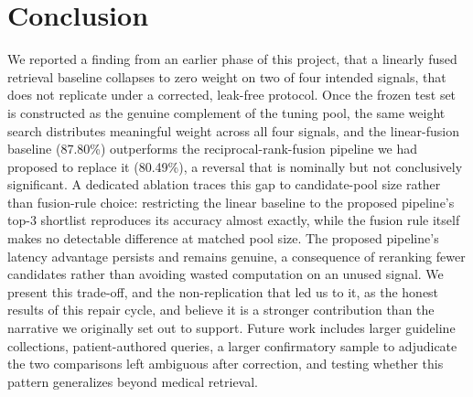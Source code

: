 \documentclass[10pt,conference]{IEEEtran}
\begin{document}
\section{Conclusion}

We reported a finding from an earlier phase of this project, that a linearly fused retrieval baseline collapses to zero weight on two of four intended signals, that does not replicate under a corrected, leak-free protocol. Once the frozen test set is constructed as the genuine complement of the tuning pool, the same weight search distributes meaningful weight across all four signals, and the linear-fusion baseline (87.80\%) outperforms the reciprocal-rank-fusion pipeline we had proposed to replace it (80.49\%), a reversal that is nominally but not conclusively significant. A dedicated ablation traces this gap to candidate-pool size rather than fusion-rule choice: restricting the linear baseline to the proposed pipeline's top-3 shortlist reproduces its accuracy almost exactly, while the fusion rule itself makes no detectable difference at matched pool size. The proposed pipeline's latency advantage persists and remains genuine, a consequence of reranking fewer candidates rather than avoiding wasted computation on an unused signal. We present this trade-off, and the non-replication that led us to it, as the honest results of this repair cycle, and believe it is a stronger contribution than the narrative we originally set out to support. Future work includes larger guideline collections, patient-authored queries, a larger confirmatory sample to adjudicate the two comparisons left ambiguous after correction, and testing whether this pattern generalizes beyond medical retrieval.
\end{document}
